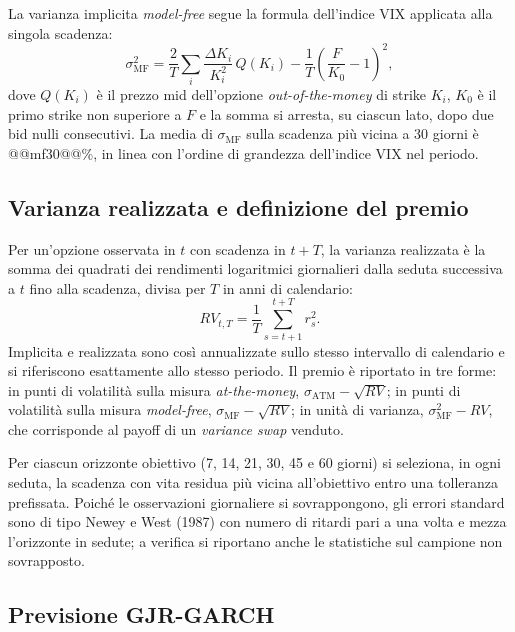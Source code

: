 \documentclass[11pt,a4paper]{article}
\begin{document}
La varianza implicita \emph{model-free} segue la formula dell'indice VIX applicata alla singola scadenza:
\begin{equation}
\sigma^2_{\mathrm{MF}} = \frac{2}{T}\sum_i \frac{\Delta K_i}{K_i^2}\, Q(K_i) - \frac{1}{T}\left(\frac{F}{K_0}-1\right)^2 ,
\end{equation}
dove $Q(K_i)$ è il prezzo mid dell'opzione \emph{out-of-the-money} di strike $K_i$, $K_0$ è il primo strike non superiore a $F$ e la somma si arresta, su ciascun lato, dopo due bid nulli consecutivi. La media di $\sigma_{\mathrm{MF}}$ sulla scadenza più vicina a 30 giorni è @@mf30@@\%, in linea con l'ordine di grandezza dell'indice VIX nel periodo.

\subsection{Varianza realizzata e definizione del premio}

Per un'opzione osservata in $t$ con scadenza in $t+T$, la varianza realizzata è la somma dei quadrati dei rendimenti logaritmici giornalieri dalla seduta successiva a $t$ fino alla scadenza, divisa per $T$ in anni di calendario:
\begin{equation}
RV_{t,T} = \frac{1}{T}\sum_{s=t+1}^{t+T} r_s^2 .
\end{equation}
Implicita e realizzata sono così annualizzate sullo stesso intervallo di calendario e si riferiscono esattamente allo stesso periodo. Il premio è riportato in tre forme: in punti di volatilità sulla misura \emph{at-the-money}, $\sigma_{\mathrm{ATM}} - \sqrt{RV}$; in punti di volatilità sulla misura \emph{model-free}, $\sigma_{\mathrm{MF}} - \sqrt{RV}$; in unità di varianza, $\sigma^2_{\mathrm{MF}} - RV$, che corrisponde al payoff di un \emph{variance swap} venduto.

Per ciascun orizzonte obiettivo (7, 14, 21, 30, 45 e 60 giorni) si seleziona, in ogni seduta, la scadenza con vita residua più vicina all'obiettivo entro una tolleranza prefissata. Poiché le osservazioni giornaliere si sovrappongono, gli errori standard sono di tipo Newey e West (1987) con numero di ritardi pari a una volta e mezza l'orizzonte in sedute; a verifica si riportano anche le statistiche sul campione non sovrapposto.

\subsection{Previsione GJR-GARCH}
\end{document}

